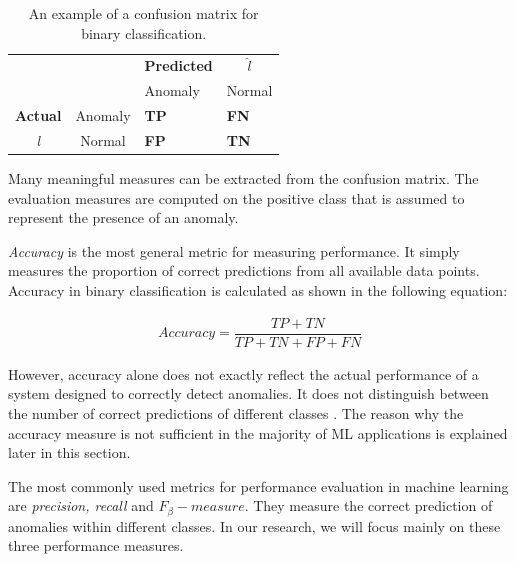 \begin{table}[!h]
\centering
\begin{tabular}{cccc}
\multicolumn{1}{r}{}                 &                              & \textbf{Predicted}          &   $\hat{l}$                          \\ \cline{3-4} 
                                     & \multicolumn{1}{l|}{}        & \multicolumn{1}{l|}{Anomaly} & \multicolumn{1}{l|}{Normal} \\ \cline{2-4} 
                                      
\multicolumn{1}{l|}{\textbf{Actual}} & \multicolumn{1}{l|}{Anomaly}  & \multicolumn{1}{l|}{\textcolor{customBlue}{\textbf{TP}}}     & \multicolumn{1}{l|}{\textcolor{customRed}{\textbf{FN}}}      \\ \cline{2-4} 
\multicolumn{1}{c|}{\textit{l}}                & \multicolumn{1}{c|}{Normal} & \multicolumn{1}{l|}{\textcolor{customDarkRed}{\textbf{FP}}}     & \multicolumn{1}{l|}{\textcolor{customGreen}{\textbf{TN}}}     \\ \cline{2-4} 
\end{tabular}
\caption{An example of a confusion matrix for binary classification.}
\label{table:confusionMatrix}
\end{table}
 
Many meaningful measures can be extracted from the confusion matrix. The evaluation measures are computed on the positive class that is assumed to represent the presence of an anomaly.

\textit{Accuracy} is the most general metric for measuring performance. It simply measures the proportion of correct predictions from all available data points. Accuracy in binary classification is calculated as shown in the following equation:

\begin{align}
    Accuracy = \dfrac{TP + TN}{TP + TN + FP + FN}
\end{align}

However, accuracy alone does not exactly reflect the actual performance of a system designed to correctly detect anomalies. It does not distinguish between the number of correct predictions of different classes \cite{performanceEvaluation2006}. The reason why the accuracy measure is not sufficient in the majority of ML applications is explained later in this section. 

The most commonly used metrics for performance evaluation in machine learning are \textit{precision, recall} and ${F_{\beta}-measure}$. They measure the correct prediction of anomalies within different classes. In our research, we will focus mainly on these three performance measures.

